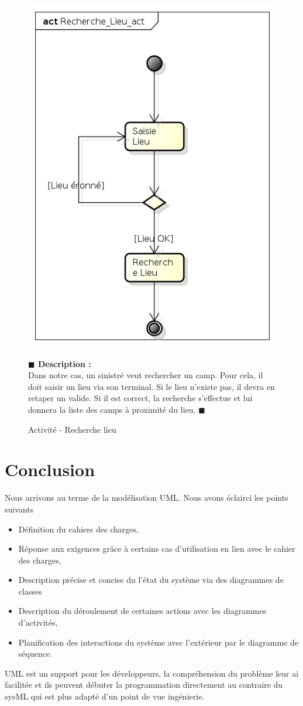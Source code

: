 \documentclass[11pt, titlepage]{report}
\newcommand{\debutDescription}{\noindent\textbf{\textcolor{DescriptionColor}{$\blacksquare$  Description : \\}}}
\newcommand{\finDescription}{\noindent\textcolor{DescriptionColor}{$\blacksquare$}}
\begin{document}
\begin{figure}[h!]
\begin{center}
\includegraphics[scale=.4]{../images/diagrammes/uml/complementaire/Recherche_Lieu_act.png} 
\caption{Activité - Recherche lieu}
\end{center}
\debutDescription
Dans notre cas, un sinistré veut rechercher un camp. Pour cela, il doit saisir un lieu via son terminal. Si le lieu n'existe pas, il devra en retaper un valide. Si il est correct, la recherche s'effectue et lui donnera la liste des camps à proximité du lieu.
\finDescription
\end{figure}


\clearpage
\section{Conclusion}
Nous arrivons au terme de la modélisation UML. Nous avons éclairci les points suivants 
\begin{itemize}
\item Définition du cahiers des charges,
\item Réponse aux exigences grâce à certains cas d'utilisation en lien avec le cahier des charges,
\item Description précise et concise du l'état du système via des diagrammes de classes
\item Description du déroulement de certaines actions avec les diagrammes d'activités,
\item Planification des interactions du système avec l’extérieur par le diagramme de séquence.
\end{itemize} 
UML est un support pour les développeurs, la compréhension du problème leur ai facilitée et ils peuvent débuter la programmation directement au contraire du sysML qui est plus adapté d'un point de vue ingénierie.
\end{document}
